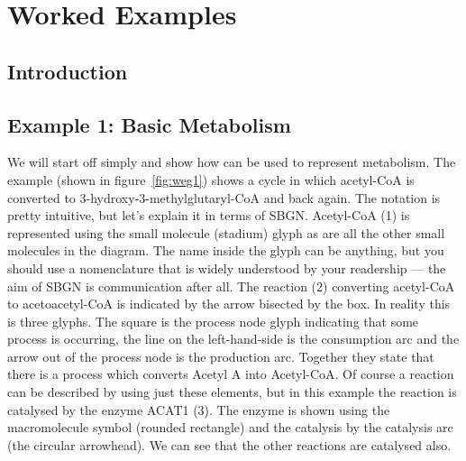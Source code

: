 \chapter{Worked Examples}
\label{chp:worked-egs}

\section{Introduction}

\section{Example 1: Basic Metabolism}

We will start off simply and show how \PD can be used to represent
metabolism. The example (shown in figure~\ref{fig:weg1}) shows a cycle
in which acetyl-CoA is converted to 3-hydroxy-3-methylglutaryl-CoA and
back again. The notation is pretty intuitive, but let's explain it in
terms of SBGN. Acetyl-CoA (1) is represented using the small molecule
(stadium) glyph as are all the other small molecules in the
diagram. The name inside the glyph can be anything, but you should use
a nomenclature that is widely understood by your readership --- the
aim of SBGN is communication after all. The reaction (2) converting
acetyl-CoA to acetoacetyl-CoA is indicated by the arrow bisected by
the box. In reality this is three glyphs. The square is the process
node glyph indicating that some process is occurring, the line on the
left-hand-side is the consumption arc and the arrow out of the process
node is the production arc. Together they state that there is a
process which converts Acetyl A into Acetyl-CoA. Of course a reaction
can be described by using just these elements, but in this example the
reaction is catalysed by the enzyme ACAT1 (3). The enzyme is shown
using the macromolecule symbol (rounded rectangle) and the catalysis
by the catalysis arc (the circular arrowhead). We can see that the
other reactions are catalysed also.

